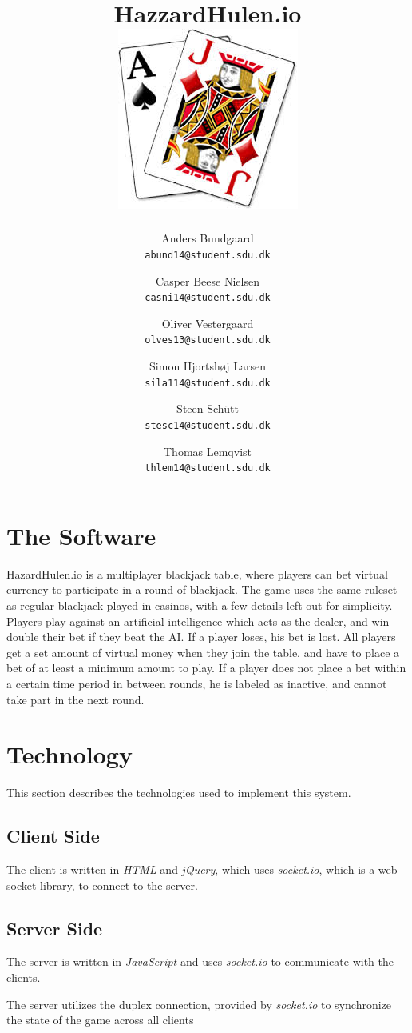 \documentclass[a4paper]{article}
\title{HazzardHulen.io\\[4cm]
\includegraphics[width=.7\textwidth]{blackjack}
\vfill}
\author{
  Anders Bundgaard\\
  \texttt{abund14@student.sdu.dk}
  \and
  Casper Beese Nielsen\\
  \texttt{casni14@student.sdu.dk}
  \and
  Oliver Vestergaard\\
  \texttt{olves13@student.sdu.dk}
  \and
  Simon Hjortshøj Larsen\\
  \texttt{sila114@student.sdu.dk}
  \and
  Steen Schütt\\
  \texttt{stesc14@student.sdu.dk}
  \and
  Thomas Lemqvist\\
  \texttt{thlem14@student.sdu.dk}
}
\begin{document}
\maketitle
\newpage
\tableofcontents
\newpage


\section{The Software}
HazardHulen.io is a multiplayer blackjack table, where players can bet virtual
currency to participate in a round of blackjack. The game uses the same ruleset
as regular blackjack played in casinos, with a few details left out for
simplicity.
Players play against an artificial intelligence which acts as the dealer, and
win double their bet if they beat the AI. If a player loses, his bet is lost.
All players get a set amount of virtual money when they join the table, and have
to place a bet of at least a minimum amount to play. If a player does not place
a bet within a certain time period in between rounds, he is labeled as inactive,
and cannot take part in the next round.
\section{Technology}
This section describes the technologies used to implement this system.
\subsection{Client Side}
The client is written in \textit{HTML} and \textit{jQuery}, which uses \textit{socket.io}, which is
a web socket library, to connect to the server.
\subsection{Server Side}
The server is written in \textit{JavaScript} and uses \textit{socket.io} to communicate with
the clients.

The server utilizes the duplex connection, provided by \textit{socket.io} to
synchronize the state of the game across all clients
\end{document}
